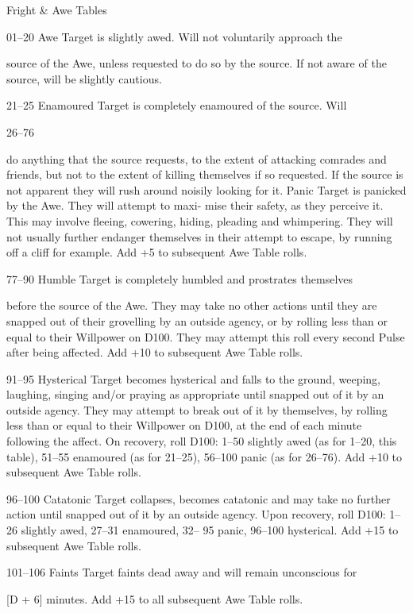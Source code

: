 \begin{Chapter}{Fright \& Awe Tables}
 

 

01–20   Awe Target is slightly awed. Will not voluntarily approach the 

source of the Awe, unless requested to do so by the source. If not 
aware of the source, will be slightly cautious. 

21–25   Enamoured Target is completely enamoured of the source. Will 

26–76  

do anything that the source requests, to the extent of attacking 
comrades and friends, but not to the extent of killing themselves if 
so requested. If the source is not apparent they will rush around 
noisily looking for it. 
Panic Target is panicked by the Awe. They will attempt to maxi-
mise their safety, as they perceive it. This may involve fleeing, 
cowering, hiding, pleading and whimpering. They will not usually 
further endanger themselves in their attempt to escape, by running 
off a cliff for example. Add +5 to subsequent Awe Table rolls. 

77–90   Humble Target is completely humbled and prostrates themselves 

before the source of the Awe. They may take no other actions 
until they are snapped out of their grovelling by an outside 
agency, or by rolling less than or equal to their Willpower on 
D100. They may attempt this roll every second Pulse after being 
affected. Add +10 to subsequent Awe Table rolls. 

91–95   Hysterical Target becomes hysterical and falls to the ground, 
weeping, laughing, singing and/or praying as appropriate until 
snapped out of it by an outside agency. They may attempt to 
break out of it by themselves, by rolling less than or equal to their 
Willpower on D100, at the end of each minute following the 
affect. On recovery, roll D100: 1–50 slightly awed (as for 1–20, 
this table), 51–55 enamoured (as for 21–25), 56–100 panic (as for 
26–76). Add +10 to subsequent Awe Table rolls. 

96–100   Catatonic Target collapses, becomes catatonic and may take no 
further action until snapped out of it by an outside agency. Upon 
recovery, roll D100: 1–26 slightly awed, 27–31 enamoured, 32–
95 panic, 96–100 hysterical. Add +15 to subsequent Awe Table 
rolls. 

101–106   Faints Target faints dead away and will remain unconscious for 

[D + 6] minutes. Add +15 to all subsequent Awe Table rolls. 


\end{Chapter}
